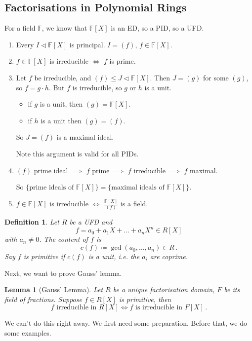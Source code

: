 \documentclass{article}
\theoremstyle{plain}\theoremheaderfont{\normalfont\itshape}\theorembodyfont{\rmfamily}\theoremseparator{.}\newtheorem*{rem}{Remark}\newtheorem*{ex}{Example}\newtheorem*{proof}{Proof}\newtheorem*{altp}{Alternative proof}\newtheorem*{nonex}{Non-Example}
\theoremstyle{plain}\theoremheaderfont{\normalfont\bfseries}\theorembodyfont{\rmfamily}\theoremseparator{.}\newtheorem{thm}{Theorem}[section]\newtheorem{lem}[thm]{Lemma}\newtheorem{prop}[thm]{Proposition}\newtheorem*{cor}{Corollary}\newtheorem{defn}[thm]{Definition}\newtheorem{clm}[thm]{Claim}\newtheorem{clminproof}{Claim}\newtheorem*{notn}{Notation}\newtheorem*{exer}{Exercise}\newtheorem*{lemnn}{Lemma}
\theoremstyle{break}\theoremheaderfont{\normalfont\itshape}\theorembodyfont{\rmfamily}\theoremseparator{.\medskip}\newtheorem*{proofskip}{Proof}\newtheorem*{exs}{Examples}\newtheorem*{rems}{Remarks}\newtheorem*{obs}{Observations}
\theoremstyle{break}\theoremheaderfont{\normalfont\bfseries}\theorembodyfont{\rmfamily}\theoremseparator{.\medskip}\newtheorem{lemskip}[thm]{Lemma}\newtheorem{defnskip}[thm]{Definition}\newtheorem{propskip}[thm]{Proposition}\newtheorem{thmskip}[thm]{Theorem}
\numberwithin{equation}{section}
\newcommand{\FF}{\mathbb{F}}
\begin{document}
    \subsection{Factorisations in Polynomial Rings}
    For a field \(\FF\), we know that \(\FF[X]\) is an ED, so a PID, so a UFD.
    \begin{enumerate}[topsep=0pt,label=(\roman*)]
        \item Every \(I\lhd \FF[X]\) is principal. \(I=(f)\), \(f\in\FF[X]\).
        \item \(f\in\FF[X]\) is irreducible \(\iff\) \(f\) is prime.
        \item Let \(f\) be irreducible, and \((f)\le J\lhd\FF[X]\). Then \(J=(g)\) for some \((g)\), so \(f=g\cdot h\). But \(f\) is irreducible, so \(g\) or \(h\) is a unit.
        \begin{itemize}[topsep=0pt]
            \item if \(g\) is a unit, then \((g)=\FF[X]\).
            \item if \(h\) is a unit then \((g)=(f)\).
        \end{itemize}
        So \(J=(f)\) is a maximal ideal.

        Note this argument is valid for all PIDs.
        \item \((f)\) prime ideal \(\implies\) \(f\) prime \(\implies\) \(f\) irreducible \(\implies\) \(f\) maximal.
        
        So \(\{\text{prime ideals of }\FF[X]\}=\{\text{maximal ideals of }\FF[X]\}\).
        \item \(f\in\FF[X]\) is irreducible \(\iff\) \(\frac{\FF[X]}{(f)}\) is a field.
    \end{enumerate}
    \begin{defn}
        Let \(R\) be a UFD and
        \[f=a_0+a_1X+\dots+a_nX^n\in R[X]\]
        with \(a_n\ne 0\). The content of \(f\) is
        \[c(f)\coloneqq\gcd(a_0,\dots,a_n)\in R\,.\]
        Say \(f\) is primitive if \(c(f)\) is a unit, i.e. the \(a_i\) are coprime.
    \end{defn}
    Next, we want to prove Gauss' lemma.
    \begin{lemnn}[Gauss' Lemma]
        Let \(R\) be a unique factorisation domain, \(F\) be its field of fractions. Suppose \(f\in R[X]\) is primitive, then
        \[f\text{ irreducible in }R[X]\iff f\text{ is irreducible in }F[X]\,.\]
    \end{lemnn}
    We can't do this right away. We first need some preparation. Before that, we do some examples.
\end{document}
